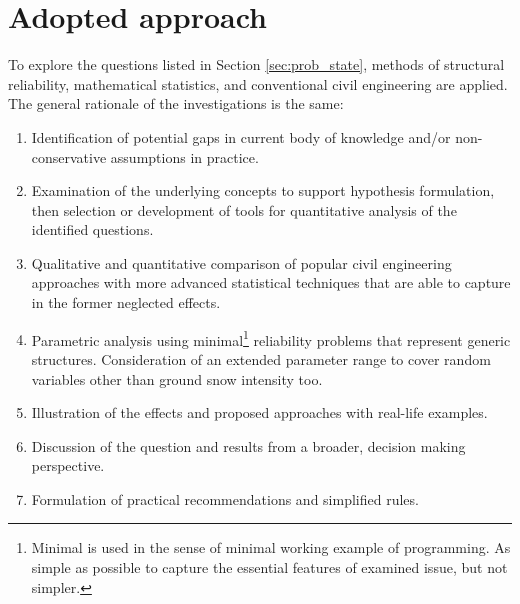 


\section{Adopted approach}
\label{sec:solu_strat}

To explore the questions listed in Section \ref{sec:prob_state}, methods of structural reliability, mathematical statistics, and conventional civil engineering are applied. The general rationale of the investigations is the same: 
\begin{enumerate}
	\item Identification of potential gaps in current body of knowledge and/or non-conservative assumptions in practice.
	\item Examination of the underlying concepts to support hypothesis formulation, then selection or development of tools for quantitative analysis of the identified questions. 
	\item Qualitative and quantitative comparison of popular civil engineering approaches with more advanced statistical techniques that are able to capture in the former neglected effects.
	\item Parametric analysis using minimal\footnote{Minimal is used in the sense of minimal working example of programming. As simple as possible to capture the essential features of examined issue, but not simpler.} reliability problems that represent generic structures. Consideration of an extended parameter range to cover random variables other than ground snow intensity too.
	\item Illustration of the effects and proposed approaches with real-life examples.
	\item Discussion of the question and results from a broader, decision making perspective.
	\item Formulation of practical recommendations and simplified rules.
\end{enumerate}

